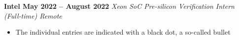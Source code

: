 \documentclass[../main.tex]{subfiles}
\begin{document}
\textbf{{\fontsize{12}{14}\selectfont Intel \hfill May 2022 – August 2022}}\newline
\emph{Xeon SoC Pre-silicon Verification Intern (Full-time) \hfill Remote} \\
\vspace{-8.5mm}
\begin{itemize}
  \item The individual entries are indicated with a black dot, a so-called bullet
\end{itemize}
\end{document}
